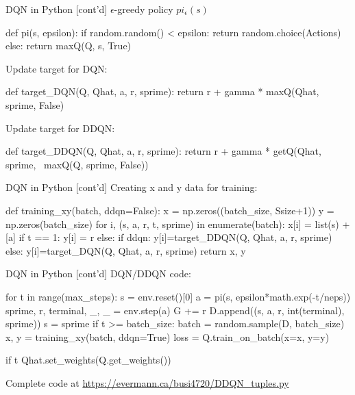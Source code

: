 \documentclass[ignorenonframetext,xcolor=x11names]{beamer}
\begin{document}
\begin{frame}[fragile]{DQN in Python \small [cont'd]}
$\epsilon$-greedy policy $pi_\epsilon(s)$
\begin{pythoncode}
def pi(s, epsilon):
    if random.random() < epsilon:
        return random.choice(Actions)
    else:
        return maxQ(Q, s, True)
\end{pythoncode}
Update target for DQN:
\begin{pythoncode}
def target_DQN(Q, Qhat, a, r, sprime):
    return r + gamma * maxQ(Qhat, sprime, False)
\end{pythoncode}
Update target for DDQN:
\begin{pythoncode}
def target_DDQN(Q, Qhat, a, r, sprime):
    return r + gamma * getQ(Qhat, sprime, \ 
                               maxQ(Q, sprime, False))
\end{pythoncode}
\end{frame}

\begin{frame}[fragile]{DQN in Python \small [cont'd]}
Creating x and y data for training:
\begin{pythoncode}
def training_xy(batch, ddqn=False):
    x = np.zeros((batch_size, Ssize+1))
    y = np.zeros(batch_size)
    for i, (s, a, r, t, sprime) in enumerate(batch):
        x[i] = list(s) + [a]
        if t == 1:
            y[i] = r
        else:
            if ddqn:
                y[i]=target_DDQN(Q, Qhat, a, r, sprime)
            else:
                y[i]=target_DQN(Q, Qhat, a, r, sprime)
    return x, y
\end{pythoncode}
\end{frame}

\begin{frame}[fragile]{DQN in Python \small [cont'd]}
DQN/DDQN code:
\begin{pythoncode}
for t in range(max_steps):
    s = env.reset()[0]
    a = pi(s, epsilon*math.exp(-t/neps))
    sprime, r, terminal, _, _ = env.step(a)
    G += r
    D.append((s, a, r, int(terminal), sprime))
    s = sprime
    if t >= batch_size:
        batch = random.sample(D, batch_size)
        x, y = training_xy(batch, ddqn=True)
        loss = Q.train_on_batch(x=x, y=y)

    if t %
        Qhat.set_weights(Q.get_weights())
\end{pythoncode}

Complete code at \url{https://evermann.ca/busi4720/DDQN_tuples.py}
\end{frame}
\end{document}
